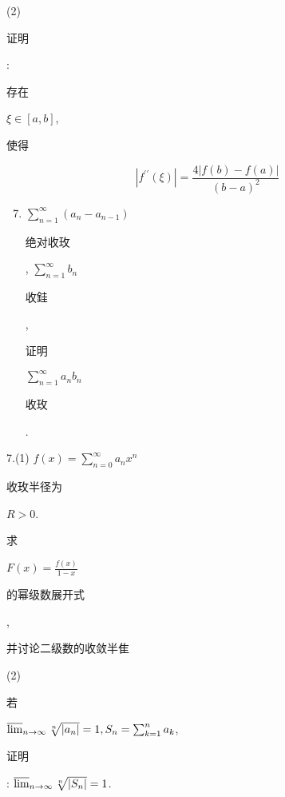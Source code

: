 \documentclass[10pt]{article}
\begin{document}
(2) \begin{CJK}{UTF8}{mj}证明\end{CJK}: \begin{CJK}{UTF8}{mj}存在\end{CJK} $\xi \in[a, b]$, \begin{CJK}{UTF8}{mj}使得\end{CJK}
$$
\left|f^{\prime \prime}(\xi)\right|=\frac{4|f(b)-f(a)|}{(b-a)^{2}}
$$

\begin{enumerate}
  \setcounter{enumi}{6}
  \item $\sum_{n=1}^{\infty}\left(a_{n}-a_{n-1}\right)$ \begin{CJK}{UTF8}{mj}绝对收玫\end{CJK}, $\sum_{n=1}^{\infty} b_{n}$ \begin{CJK}{UTF8}{mj}收銈\end{CJK}, \begin{CJK}{UTF8}{mj}证明\end{CJK} $\sum_{n=1}^{\infty} a_{n} b_{n}$ \begin{CJK}{UTF8}{mj}收玫\end{CJK}.
\end{enumerate}
7.(1) $f(x)=\sum_{n=0}^{\infty} a_{n} x^{n}$ \begin{CJK}{UTF8}{mj}收玫半径为\end{CJK} $R>0$. \begin{CJK}{UTF8}{mj}求\end{CJK} $F(x)=\frac{f(x)}{1-x}$ \begin{CJK}{UTF8}{mj}的幂级数展开式\end{CJK}, \begin{CJK}{UTF8}{mj}并讨论二级数的收敛半隹\end{CJK}

(2) \begin{CJK}{UTF8}{mj}若\end{CJK} $\varlimsup_{n \rightarrow \infty} \sqrt[n]{\left|a_{n}\right|}=1, S_{n}=\sum_{k=1}^{n} a_{k}$, \begin{CJK}{UTF8}{mj}证明\end{CJK}: $\varlimsup_{n \rightarrow \infty} \sqrt[n]{\left|S_{n}\right|}=1$.
\end{document}
